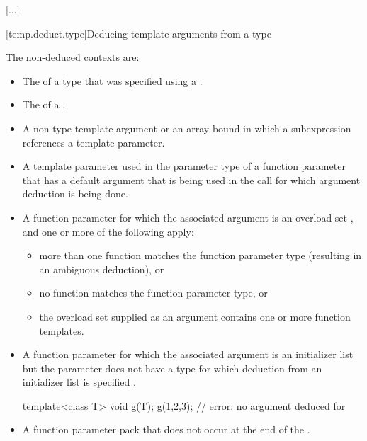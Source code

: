 \documentclass{wg21}
\begin{document}
\textcolor{noteclr}{[...]}

[temp.deduct.type]{Deducing template arguments from a type}


\pnum
The non-deduced contexts are:

%
\begin{itemize}
    \item
    The
    of a type that was specified using a
    .
    \item
    The  of a .
    \item
    A non-type template argument or an array bound in which a subexpression
    references a template parameter.
    \item
    A template parameter used in the parameter type of a function parameter that
    has a default argument that is being used in the call for which argument
    deduction is being done.
    \item
    A function parameter for which the associated argument is an
    overload set , and one or more of the following apply:
    \begin{itemize}
        \item
        more than one function matches the function parameter type (resulting in
        an ambiguous deduction), or
        \item
        no function matches the function parameter type, or
        \item
        the overload set supplied as an argument contains one or more function templates.
    \end{itemize}
    \item A function parameter for which the associated argument is an initializer
    list  but the parameter does not have
    a type for which deduction from an initializer list is specified .
    \begin{example}
        \begin{codeblock}
            template<class T> void g(T);
            g({1,2,3});                 // error: no argument deduced for 
        \end{codeblock}
    \end{example}
    \item A function parameter pack that does not occur at the end of the
    .
\end{itemize}
\end{document}
